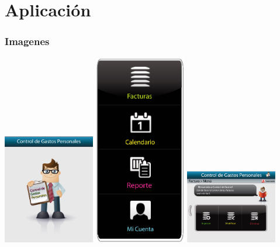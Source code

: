 \documentclass[utf8]{beamer}
\begin{document}
\section{Aplicación}  
\begin{frame}[allowframbreaks]
\frametitle{Imagenes}
\begin{center}
\includegraphics[width=0.3\textwidth]{cargando.png}
\includegraphics[width=0.3\textwidth]{menuprincipal.png}
\includegraphics[width=0.3\textwidth]{factura.png}
\end{center}
\end{frame}
\end{document}

